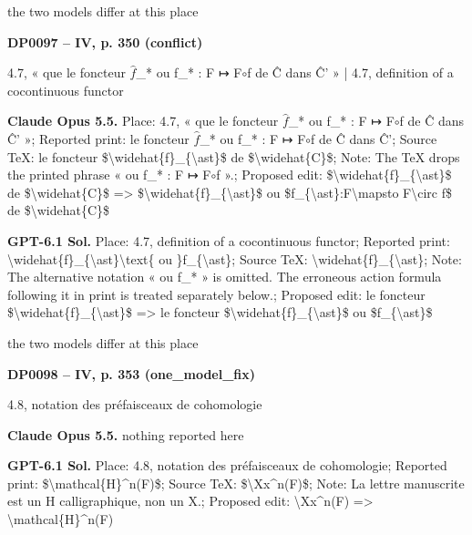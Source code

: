 the two models differ at this place\par
\par\noindent\hypertarget{DP0097}{}\textbf{DP0097 -- IV, p. 350 (conflict)}\par
4.7, « que le foncteur \ensuremath{\hat{f}}\_* ou f\_* : F ↦ F\ensuremath{\circ}f de Ĉ dans Ĉ' » | 4.7, definition of a cocontinuous functor\par
\textbf{Claude Opus 5.5.} Place: 4.7, « que le foncteur \ensuremath{\hat{f}}\_* ou f\_* : F ↦ F\ensuremath{\circ}f de Ĉ dans Ĉ' »; Reported print: le foncteur \ensuremath{\hat{f}}\_* ou f\_* : F ↦ F\ensuremath{\circ}f de Ĉ dans Ĉ'; Source TeX: le foncteur \$\textbackslash{}widehat\{f\}\_\{\textbackslash{}ast\}\$ de \$\textbackslash{}widehat\{C\}\$; Note: The TeX drops the printed phrase « ou f\_* : F ↦ F\ensuremath{\circ}f ».; Proposed edit: \$\textbackslash{}widehat\{f\}\_\{\textbackslash{}ast\}\$ de \$\textbackslash{}widehat\{C\}\$ =\allowbreak > \$\textbackslash{}widehat\{f\}\_\{\textbackslash{}ast\}\$ ou \$f\_\{\textbackslash{}ast\}:F\textbackslash{}mapsto F\textbackslash{}circ f\$ de \$\textbackslash{}widehat\{C\}\$\par
\textbf{GPT-6.1 Sol.} Place: 4.7, definition of a cocontinuous functor; Reported print: \textbackslash{}widehat\{f\}\_\{\textbackslash{}ast\}\textbackslash{}text\{ ou \}f\_\{\textbackslash{}ast\}; Source TeX: \textbackslash{}widehat\{f\}\_\{\textbackslash{}ast\}; Note: The alternative notation « ou f\_* » is omitted. The erroneous action formula following it in print is treated separately below.; Proposed edit: le foncteur \$\textbackslash{}widehat\{f\}\_\{\textbackslash{}ast\}\$ =\allowbreak > le foncteur \$\textbackslash{}widehat\{f\}\_\{\textbackslash{}ast\}\$ ou \$f\_\{\textbackslash{}ast\}\$\par
the two models differ at this place\par
\par\noindent\hypertarget{DP0098}{}\textbf{DP0098 -- IV, p. 353 (one\_model\_fix)}\par
4.8, notation des préfaisceaux de cohomologie\par
\textbf{Claude Opus 5.5.} nothing reported here\par
\textbf{GPT-6.1 Sol.} Place: 4.8, notation des préfaisceaux de cohomologie; Reported print: \$\textbackslash{}mathcal\{H\}\textasciicircum{}n(F)\$; Source TeX: \$\textbackslash{}Xx\textasciicircum{}n(F)\$; Note: La lettre manuscrite est un H calligraphique, non un X.; Proposed edit: \textbackslash{}Xx\textasciicircum{}n(F) =\allowbreak > \textbackslash{}mathcal\{H\}\textasciicircum{}n(F)\par
